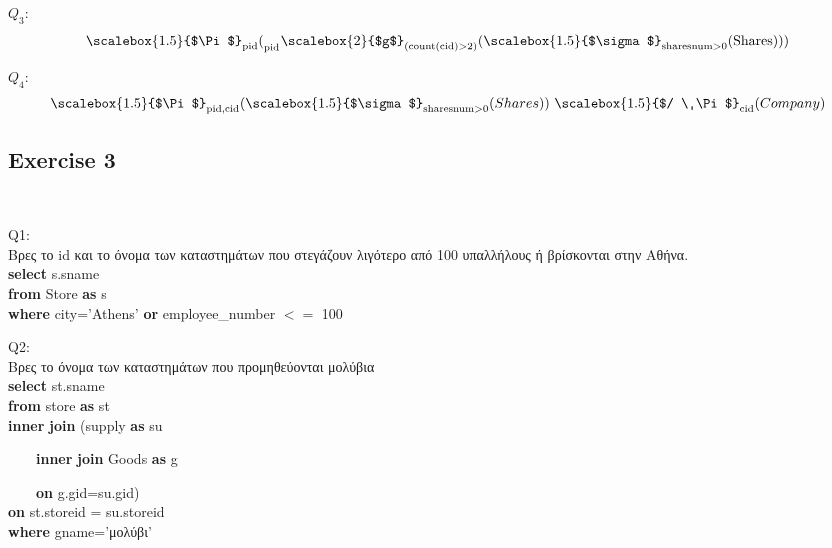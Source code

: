 \documentclass[a4paper]{article}
\begin{document}
$Q_3:$
\[
	\scalebox{1.5}{$\Pi$}_{\text{pid}}(_{_{\text{\scriptsize pid}}}\scalebox{2}{$g$}_{\text{(count(cid)}>\text{2})}(\scalebox{1.5}{$\sigma$}_{\text{sharesnum} > \text{0}}(\text{Shares})))
\]

$Q_4:$
\[
	\scalebox{1.5}{$\Pi$}_{\text{pid,cid}}(\scalebox{1.5}{$\sigma$}_{\text{sharesnum} > \text{0}}(Shares)) \ \scalebox{1.5}{$/ \ \Pi$}_{\text{cid}}(Company)
\]



\subsection*{Exercise 3} ~\\

\begin{minipage}{\linewidth}
Q1: \\

Βρες το id και το όνομα των καταστημάτων που στεγάζουν λιγότερο από 100 υπαλλήλους ή βρίσκονται στην Αθήνα. \\

\textbf{select} s.sname \\

\textbf{from} Store \textbf{as} s \\

\textbf{where} city='Athens' \textbf{or} employee\_number $<=$ 100 \\
\end{minipage}

\begin{minipage}{\linewidth}
Q2: \\

Βρες το όνομα των καταστημάτων που προμηθεύονται μολύβια \\

\textbf{select} st.sname \\

\textbf{from} store \textbf{as} st \\
\textbf{inner} \textbf{join} (supply \textbf{as} su  

    ~~~~\textbf{inner} \textbf{join} Goods \textbf{as} g 
     
    ~~~~\textbf{on} g.gid=su.gid) \\
\textbf{on} st.storeid = su.storeid \\

\textbf{where} gname='μολύβι' \\

\end{minipage}
\end{document}
